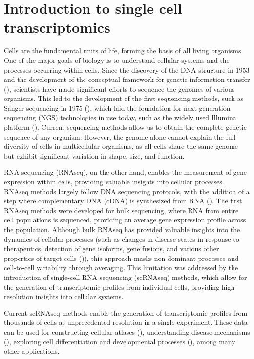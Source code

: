 \section{Introduction to single cell transcriptomics}

Cells are the fundamental units of life, forming the basis of all living organisms.
One of the major goals of biology is to understand cellular systems and the processes occurring within cells.
Since the discovery of the DNA structure in 1953
and the development of the conceptual framework for genetic information transfer (\cite{Watson1953}),
scientists have made significant efforts to sequence the genomes of various organisms.
This led to the development of the first sequencing methods, such as Sanger sequencing in 1975 (\cite{Sanger1977}),
which laid the foundation for next-generation sequencing (NGS) technologies in use today,
such as the widely used Illumina platform (\cite{Heather2016}).
Current sequencing methods allow us to obtain the complete genetic sequence of any organism.
However, the genome alone cannot explain the full diversity of cells in multicellular organisms,
as all cells share the same genome but exhibit significant variation in shape, size, and function.

RNA sequencing (RNAseq), on the other hand, enables the measurement of gene expression within cells,
providing valuable insights into cellular processes.
RNAseq methods largely follow DNA sequencing protocols,
with the addition of a step where complementary DNA (cDNA) is synthesized from RNA (\cite{Heumos2023}).
The first RNAseq methods were developed for bulk sequencing, where RNA from entire cell populations is sequenced,
providing an average gene expression profile across the population.
Although bulk RNAseq has provided valuable insights into the dynamics of cellular processes
(such as changes in disease states in response to therapeutics, detection of gene isoforms, gene fusions,
and various other properties of target cells (\cite{Heumos2023})),
this approach masks non-dominant processes and cell-to-cell variability through averaging.
This limitation was addressed by the introduction of single-cell RNA sequencing (scRNAseq) methods,
which allow for the generation of transcriptomic profiles from individual cells,
providing high-resolution insights into cellular systems.

Current scRNAseq methods enable the generation of transcriptomic profiles from thousands of cells
at unprecedented resolution in a single experiment.
These data can be used for constructing cellular atlases (\cite{Rozenblatt2017}),
understanding disease mechanisms (\cite{Zhang2024}),
exploring cell differentiation and developmental processes (\cite{Skinner2024}), among many other applications.

